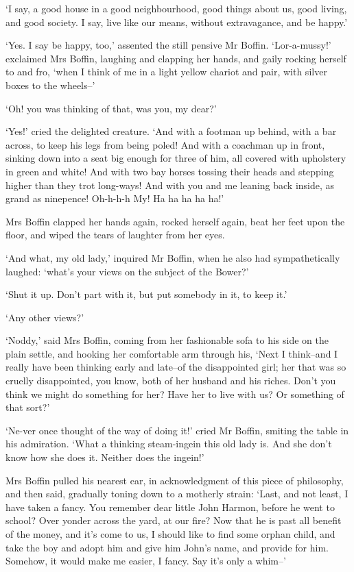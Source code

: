 ‘I say, a good house in a good neighbourhood, good things about us,
good living, and good society. I say, live like our means, without
extravagance, and be happy.’

‘Yes. I say be happy, too,’ assented the still pensive Mr Boffin.
‘Lor-a-mussy!’ exclaimed Mrs Boffin, laughing and clapping her hands,
and gaily rocking herself to and fro, ‘when I think of me in a light
yellow chariot and pair, with silver boxes to the wheels--’

‘Oh! you was thinking of that, was you, my dear?’

‘Yes!’ cried the delighted creature. ‘And with a footman up behind, with
a bar across, to keep his legs from being poled! And with a coachman
up in front, sinking down into a seat big enough for three of him, all
covered with upholstery in green and white! And with two bay horses
tossing their heads and stepping higher than they trot long-ways! And
with you and me leaning back inside, as grand as ninepence! Oh-h-h-h My!
Ha ha ha ha ha!’

Mrs Boffin clapped her hands again, rocked herself again, beat her feet
upon the floor, and wiped the tears of laughter from her eyes.

‘And what, my old lady,’ inquired Mr Boffin, when he also had
sympathetically laughed: ‘what’s your views on the subject of the
Bower?’

‘Shut it up. Don’t part with it, but put somebody in it, to keep it.’

‘Any other views?’

‘Noddy,’ said Mrs Boffin, coming from her fashionable sofa to his side
on the plain settle, and hooking her comfortable arm through his,
‘Next I think--and I really have been thinking early and late--of the
disappointed girl; her that was so cruelly disappointed, you know, both
of her husband and his riches. Don’t you think we might do something for
her? Have her to live with us? Or something of that sort?’

‘Ne-ver once thought of the way of doing it!’ cried Mr Boffin, smiting
the table in his admiration. ‘What a thinking steam-ingein this old lady
is. And she don’t know how she does it. Neither does the ingein!’

Mrs Boffin pulled his nearest ear, in acknowledgment of this piece of
philosophy, and then said, gradually toning down to a motherly strain:
‘Last, and not least, I have taken a fancy. You remember dear little
John Harmon, before he went to school? Over yonder across the yard, at
our fire? Now that he is past all benefit of the money, and it’s come to
us, I should like to find some orphan child, and take the boy and adopt
him and give him John’s name, and provide for him. Somehow, it would
make me easier, I fancy. Say it’s only a whim--’

